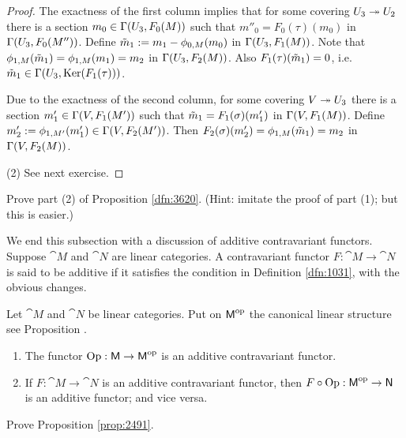 \begin{proof}
The exactness of the first column implies that for some covering 
$U_3 \twoheadrightarrow U_2$ there is a section  
$m_0 \in \Gamma(U_3, F_0(M))$
such that 
$m''_0 = F_0(\tau)(m_0)$ in $\Gamma(U_3, F_0(M''))$.
Define 
$\tilde{m}_1 := m_1 - \phi_{0, M}(m_0)$ in $\Gamma(U_3, F_1(M))$.
Note that 
$\phi_{1, M}(\tilde{m}_1) = \phi_{1, M}(m_1) = m_2$ in $\Gamma(U_3, F_2(M))$.
Also $F_1(\tau)(\tilde{m}_1) = 0$, i.e.\ 
$\tilde{m}_1 \in \Gamma(U_3, \operatorname{Ker}(F_1(\tau)))$.

Due to the exactness of the second column, for some covering 
$V \twoheadrightarrow U_3$ there is a section 
$m'_1 \in \Gamma(V, F_1(M'))$
such that 
$\tilde{m}_1 = F_1(\sigma)(m'_1)$ in $\Gamma(V, F_1(M))$.
Define
$m'_2 := \phi_{1, M'}(m'_1) \in \Gamma(V, F_2(M'))$.
Then 
$F_2(\sigma)(m'_2) = \phi_{1, M}(\tilde{m}_1) = m_2$ in $\Gamma(V, F_2(M))$.

\medskip \noindent 
(2) See next exercise.
\end{proof}

\begin{exer} \label{exer:3625}
Prove part (2) of Proposition \ref{dfn:3620}. (Hint: imitate the proof of part 
(1); but this is easier.)
\end{exer}

We end this subsection with a discussion of additive contravariant functors. 
Suppose $\cat{M}$ and $\cat{N}$ are linear categories. A contravariant functor 
$F : \cat{M} \to \cat{N}$ is said to be additive if it satisfies the condition 
in Definition \ref{dfn:1031}, with the obvious changes. 

\begin{prop} \label{prop:2491}
Let $\cat{M}$ and $\cat{N}$ be linear categories. Put on $\operatorname{\mathsf{M}}^{\mathrm{op}}$ 
the canonical linear structure \tup{(}see Proposition \tup{\ref{prop:2490})}.

\begin{enumerate}
\item The functor $\operatorname{Op} : \operatorname{\mathsf{M}} \to \operatorname{\mathsf{M}}^{\mathrm{op}}$
is an additive contravariant functor. 

\item If $F : \cat{M} \to \cat{N}$ is an additive contravariant functor, then 
$F \circ \opn{Op} : \cat{M}^{\mrm{op}} \to \lb \cat{N}$
is an additive functor; and vice versa. 
\end{enumerate}
\end{prop}

\begin{exer} 
Prove Proposition \ref{prop:2491}.
\end{exer}


